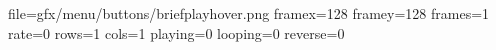 file=gfx/menu/buttons/briefplayhover.png
framex=128
framey=128
frames=1
rate=0
rows=1
cols=1
playing=0
looping=0
reverse=0